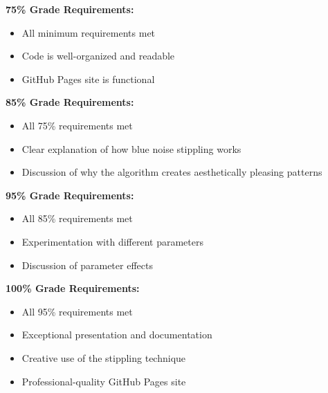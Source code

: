 \documentclass[
  letterpaper,
  DIV=11,
  numbers=noendperiod]{scrartcl}
\providecommand{\tightlist}{%
  \setlength{\itemsep}{0pt}\setlength{\parskip}{0pt}}
\begin{document}
\textbf{75\% Grade Requirements:}

\begin{itemize}
\tightlist
\item[$\square$]
  All minimum requirements met
\item[$\square$]
  Code is well-organized and readable
\item[$\square$]
  GitHub Pages site is functional
\end{itemize}

\textbf{85\% Grade Requirements:}

\begin{itemize}
\tightlist
\item[$\square$]
  All 75\% requirements met
\item[$\square$]
  Clear explanation of how blue noise stippling works
\item[$\square$]
  Discussion of why the algorithm creates aesthetically pleasing
  patterns
\end{itemize}

\textbf{95\% Grade Requirements:}

\begin{itemize}
\tightlist
\item[$\square$]
  All 85\% requirements met
\item[$\square$]
  Experimentation with different parameters
\item[$\square$]
  Discussion of parameter effects
\end{itemize}

\textbf{100\% Grade Requirements:}

\begin{itemize}
\tightlist
\item[$\square$]
  All 95\% requirements met
\item[$\square$]
  Exceptional presentation and documentation
\item[$\square$]
  Creative use of the stippling technique
\item[$\square$]
  Professional-quality GitHub Pages site
\end{itemize}
\end{document}
